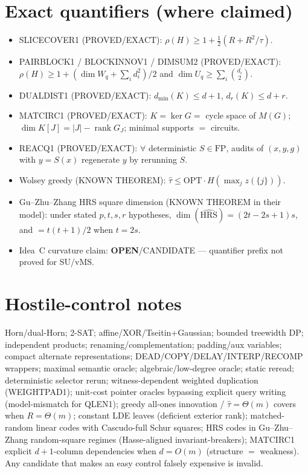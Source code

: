 \documentclass[11pt]{article}
\begin{document}
\section*{Exact quantifiers (where claimed)}
\begin{itemize}
\item SLICECOVER1 (PROVED/EXACT): $\rho(H)\ge 1+\tfrac12(R+R^2/\tau)$.
\item PAIRBLOCK1 / BLOCKINNOV1 / DIMSUM2 (PROVED/EXACT):
$\rho(H)\ge 1+(\dim W_q+\sum_i d_i^2)/2$ and $\dim U_q\ge\sum_i\binom{d_i}{2}$.
\item DUALDIST1 (PROVED/EXACT): $d_{\min}(K)\le d+1$, $d_r(K)\le d+r$.
\item MATCIRC1 (PROVED/EXACT): $K=\ker G=$ cycle space of $M(G)$;
$\dim K[J]=|J|-\operatorname{rank}G_J$; minimal supports $=$ circuits.
\item REACQ1 (PROVED/EXACT): $\forall$ deterministic $S\in\mathrm{FP}$, audits of $(x,y,g)$
with $y=S(x)$ regenerate $y$ by rerunning $S$.
\item Wolsey greedy (KNOWN THEOREM): $\widehat\tau\le\mathrm{OPT}\cdot H(\max_j z(\{j\}))$.
\item Gu--Zhu--Zhang HRS square dimension (KNOWN THEOREM in their model): under stated
$p,t,s,r$ hypotheses, $\dim(\widehat{\mathrm{HRS}})=(2t-2s+1)s$, and $=t(t+1)/2$ when $t=2s$.
\item Idea~C curvature claim: \textbf{OPEN}/CANDIDATE --- quantifier prefix not proved for SU/vMS.
\end{itemize}

\section*{Hostile-control notes}
Horn/dual-Horn; 2-SAT; affine/XOR/Tseitin+Gaussian; bounded treewidth DP; independent products;
renaming/complementation; padding/aux variables; compact alternate representations;
DEAD/COPY/DELAY/INTERP/RECOMP wrappers; maximal semantic oracle; algebraic/low-degree oracle;
static reread; deterministic selector rerun; witness-dependent weighted duplication (WEIGHTPAD1);
unit-cost pointer oracles bypassing explicit query writing (model-mismatch for QLEN1);
greedy all-ones innovation / $\widehat\tau=\Theta(m)$ covers when $R=\Theta(m)$;
constant LDE leaves (deficient exterior rank);
matched-random linear codes with Cascudo-full Schur squares;
HRS codes in Gu--Zhu--Zhang random-square regimes (Hasse-aligned invariant-breakers);
MATCIRC1 explicit $d+1$-column dependencies when $d=O(m)$ (structure $=$ weakness).
Any candidate that makes an easy control falsely expensive is invalid.
\end{document}
